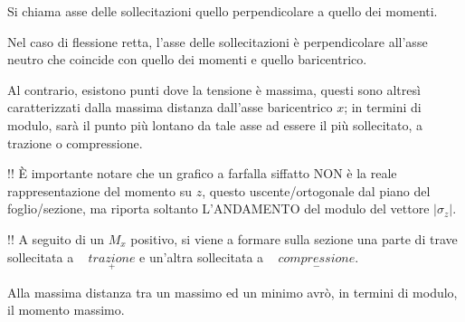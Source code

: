 \documentclass{article}
\begin{document}
\begin{adjustwidth}{2in}{}
		Si chiama asse delle sollecitazioni quello perpendicolare a quello dei momenti.
		
		Nel caso di flessione retta, l'asse delle sollecitazioni è perpendicolare all'asse neutro che coincide con quello dei momenti e quello baricentrico. \newline
		
		Al contrario, esistono punti dove la tensione è massima, questi sono altresì caratterizzati dalla massima distanza dall'asse baricentrico $x$; in termini di modulo, sarà il punto più lontano da tale asse ad essere il più sollecitato, a trazione o compressione. \newline
		
		\item[!!] È importante notare che un grafico a farfalla siffatto NON è la reale rappresentazione del momento su $z$, questo uscente/ortogonale dal piano del foglio/sezione, ma riporta soltanto L'ANDAMENTO del modulo del vettore $|\sigma_z|$. 
		
		\item[!!] A seguito di un $M_x$ positivo, si viene a formare sulla sezione una parte di trave sollecitata a ~ $  \underset{+}{trazione} $ e un'altra sollecitata a ~ $ \underset{-}{compressione} $.

		Alla massima distanza tra un massimo ed un minimo avrò, in termini di modulo, il momento massimo. 


\end{adjustwidth}
\end{document}

